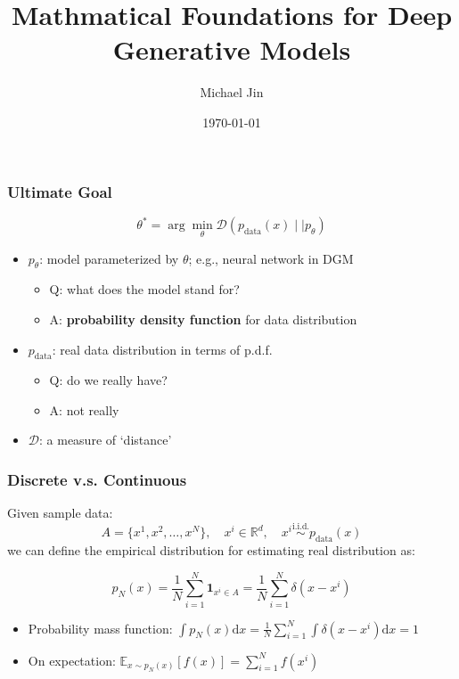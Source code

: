 \documentclass{beamer}
\title{Mathmatical Foundations for Deep Generative Models}
\author{Michael Jin}
\date{\today}
\institute{
  \small
  \faGithub\ \href{https://github.com/Michael-J1n/Mathematical-Foundation-for-Deep-Generative-Models}{\texttt{Michael-J1n}} \\[1ex]
}
\begin{document}
\frame{\titlepage}

\begin{frame}[t]
\frametitle{Ultimate Goal}
\begin{tcolorbox}[colback=blue!1!white,
                  colframe=blue!75!black]
$$\theta^*=\arg\min_\theta\mathcal{D}\left(p_{\text{data}}(x) \mid
\mid p_\theta\right)$$
\end{tcolorbox}
\vspace{2em}
\begin{itemize}
\item $p_\theta$: model parameterized by $\theta$; e.g., neural network in DGM
    \begin{itemize}
        \item Q: what does the model stand for?
        \item A: \textbf{probability density function} for data distribution
    \end{itemize}
\item $p_\text{data}$: real data distribution in terms of p.d.f.
    \begin{itemize}
        \item Q: do we really have?
        \item A: not really
    \end{itemize}
\item $\mathcal{D}$: a measure of `distance'
\end{itemize}
\end{frame}

\begin{frame}[t]
\frametitle{Discrete v.s. Continuous}
Given sample data: $$A=\{x^1,x^2,\dots, x^N\},\quad x^i\in\mathbb{R}^d,\quad x^i\overset{\text{i.i.d.}}\sim p_{\text{data}}(x)$$ we can define the empirical distribution for estimating real distribution as:
\begin{tcolorbox}[colback=blue!1!white,
                  colframe=blue!75!black]
\[\displaystyle p_N(x)=\frac{1}{N}\sum_{i = 1}^N \mathbf{1}_{x^{i}\in A}=\frac{1}{N}\sum_{i = 1}^N \delta(x-x^{i})\]
\end{tcolorbox}

\begin{itemize}
    \item Probability mass function: $\displaystyle\int p_N(x)\text{d}x=\frac{1}{N}\sum_{i=1}^N\int \delta(x-x^i)\text{d}x=1$
    \item On expectation: $\displaystyle\mathbb{E}_{x\sim p_{N}(x)}[f(x)]=\sum_{i=1}^Nf(x^i)$
\end{itemize}
\end{frame}
\end{document}
